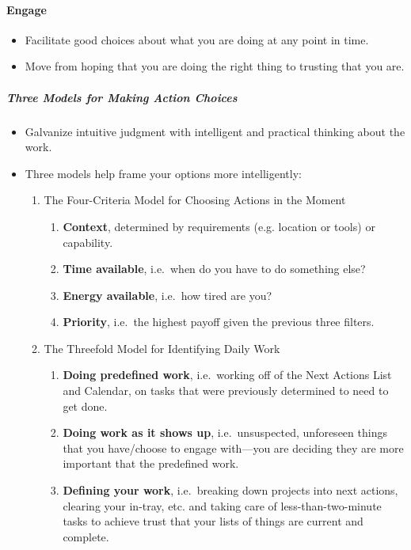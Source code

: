 \documentclass{article}
\begin{document}
\paragraph{Engage}

\begin{itemize}
  \item Facilitate good choices about what you are doing at any point in time.
  \item Move from hoping that you are doing the right thing to trusting that you are.
\end{itemize}

\subparagraph{Three Models for Making Action Choices}

\begin{itemize}
  \item Galvanize intuitive judgment with intelligent and practical thinking about the work.
  \item Three models help frame your options more intelligently:
  \begin{enumerate}
      \item The Four-Criteria Model for Choosing Actions in the Moment
      \begin{enumerate}
        \item \textbf{Context}, determined by requirements (e.g. location or tools) or capability.
        \item \textbf{Time available}, i.e.\ when do you have to do something else?
        \item \textbf{Energy available}, i.e.\ how tired are you?
        \item \textbf{Priority}, i.e.\ the highest payoff given the previous three filters.
      \end{enumerate}
      \item The Threefold Model for Identifying Daily Work
      \begin{enumerate}
        \item \textbf{Doing predefined work}, i.e.\ working off of the Next Actions List and Calendar, on tasks that were previously determined to need to get done.
        \item \textbf{Doing work as it shows up}, i.e.\ unsuspected, unforeseen things that you have/choose to engage with---you are deciding they are more important that the predefined work.
        \item \textbf{Defining your work}, i.e.\ breaking down projects into next actions, clearing your in-tray, etc. and taking care of less-than-two-minute tasks to achieve trust that your lists of things are current and complete.

\end{enumerate}
\end{enumerate}
\end{itemize}
\end{document}
